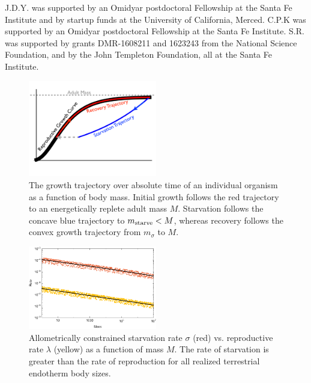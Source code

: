 \documentclass{pnastwo}
\begin{document}
\begin{article}



\begin{acknowledgments}
  J.D.Y. was supported by an Omidyar postdoctoral Fellowship at the Santa Fe
  Institute and by startup funds at the University of California, Merced.
  C.P.K was supported by an Omidyar postdoctoral Fellowship at the Santa Fe
  Institute.  S.R. was supported by grants DMR-1608211 and 1623243 from the
  National Science Foundation, and by the John Templeton Foundation, all at
  the Santa Fe Institute.
\end{acknowledgments}






\end{article}






\begin{figure}
\centering
\includegraphics[width=0.5\textwidth]{Growth-trajectory-diagram.pdf}
\caption{
The growth trajectory over absolute time of an individual organism as a function of body mass.
Initial growth follows the red trajectory to an energetically replete adult mass $M$.
Starvation follows the concave blue trajectory to $m_{\rm starve} < M$, whereas recovery follows the convex growth trajectory from $m_\sigma$ to $M$.
}
\label{fig:growth}
\end{figure}

\begin{figure}
\centering
\includegraphics[width=0.5\textwidth]{fig_GvS.pdf}
\caption{
Allometrically constrained starvation rate $\sigma$ (red) vs. reproductive rate $\lambda$ (yellow) as a function of mass $M$.
The rate of starvation is greater than the rate of reproduction for all realized terrestrial endotherm body sizes.
}
\label{fig:gvs}
\end{figure}
\end{document}
